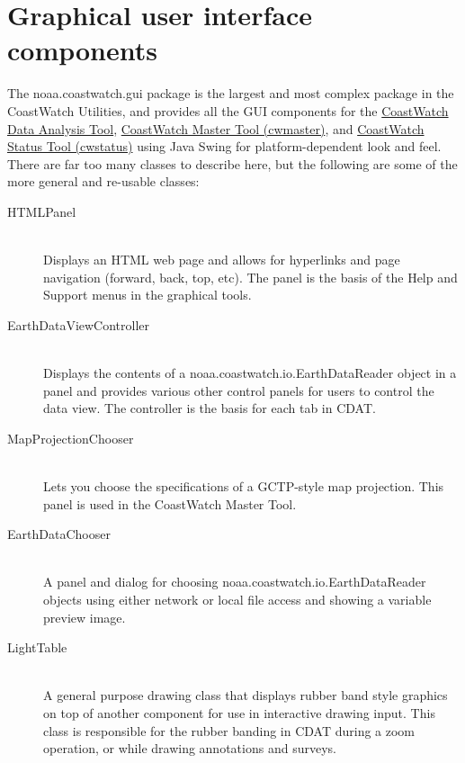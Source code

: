{\begin{description}
\end{description}

\section{Graphical user interface components}

The {\java noaa.coastwatch.gui} package is the largest and most
complex package in the CoastWatch Utilities, and provides all the
GUI components for the \hyperlink{cdatchap}{CoastWatch Data
Analysis Tool}, \hyperlink{cwmaster}{CoastWatch Master Tool
(cwmaster)}, and \hyperlink{cwstatus}{CoastWatch Status Tool
(cwstatus)} using Java Swing for platform-dependent look and
feel.  There are far too many classes to describe here, but the
following are some of the more general and re-usable classes:
\begin{description}

\item[{\java HTMLPanel}]~\\ Displays an HTML web page and allows
for hyperlinks and page navigation (forward, back, top, etc).
The panel is the basis of the {\gui Help and Support} menus in
the graphical tools.

\item[{\java EarthDataViewController}]~\\ Displays the contents
of a {\java noaa.coastwatch.io.EarthDataReader} object in a panel
and provides various other control panels for users to control
the data view.  The controller is the basis for each tab in CDAT.

\item[{\java MapProjectionChooser}]~\\ Lets you choose the
specifications of a GCTP-style map projection.  This panel is
used in the CoastWatch Master Tool.

\item[{\java EarthDataChooser}]~\\ A panel and dialog for
choosing {\java noaa.coastwatch.io.EarthDataReader} objects using
either network or local file access and showing a variable
preview image.

\item[{\java LightTable}]~\\ A general purpose drawing class that
displays rubber band style graphics on top of another component
for use in interactive drawing input.  This class is responsible
for the rubber banding in CDAT during a zoom operation, or while
drawing annotations and surveys.


\end{description}}
